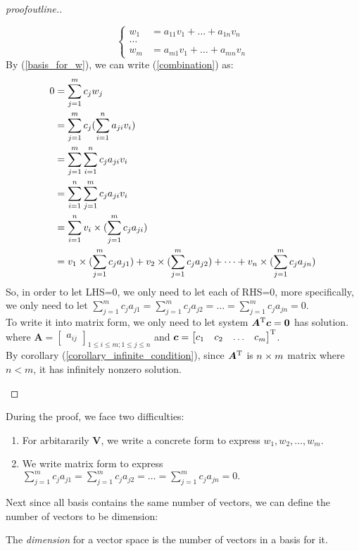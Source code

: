 \begin{proof}[proofoutline.]
\begin{itemize}
\begin{equation}
\left\{\begin{aligned}
w_1 &= a_{11}v_1 +\dots+a_{1n}v_n\\
\dots\\
w_m &= a_{m1}v_1 +\dots + a_{mn}v_n
\end{aligned}\right.
\end{equation}
By (\ref{basis_for_w}), we can write (\ref{combination}) as:
\[
\begin{aligned}
0 &= \sum_{j=1}^{m}c_jw_j\\
  &= \sum_{j=1}^{m}c_j(\sum_{i=1}^{n}a_{ji}v_i)\\
  &= \sum_{j=1}^{m}\sum_{i=1}^{n}c_ja_{ji}v_i\\
  &= \sum_{i=1}^{n}\sum_{j=1}^{m}c_ja_{ji}v_i\\
  &= \sum_{i=1}^{n}v_i\times(\sum_{j=1}^{m}c_ja_{ji})\\
  &= v_1\times(\sum_{j=1}^{m}c_ja_{j1}) + v_2\times(\sum_{j=1}^{m}c_ja_{j2}) +\dots +v_n\times(\sum_{j=1}^{m}c_ja_{jn})
\end{aligned}
\]
So, in order to let LHS=0, we only need to let each of RHS=0, more specifically, we only need to let $
\sum_{j=1}^{m}c_ja_{j1} = \sum_{j=1}^{m}c_ja_{j2} = \dots = \sum_{j=1}^{m}c_ja_{jn} = 0.$
\\To write it into matrix form, we only need to let system $\bm A^{\mathrm T} \bm c = \bm 0$ has solution. \\where $\bm A = \begin{bmatrix}
a_{ij}
\end{bmatrix}_{1\le i\le m;1\le j\le n}$ and $\bm c = \begin{bmatrix}
c_1&c_2&\dots&c_m
\end{bmatrix}^{\mathrm T}$.\\
By corollary (\ref{corollary_infinite_condition}), since $\bm A^{\mathrm T}$ is $n\times m$ matrix where $n<m$, it has infinitely nonzero solution.
\end{itemize}
\end{proof}
During the proof, we face two difficulties:
\begin{enumerate}
\item
For arbitararily $\bm V$, we write a concrete form to express $w_1,w_2,\dots,w_m$.
\item
We write matrix form to express $\sum_{j=1}^{m}c_ja_{j1} = \sum_{j=1}^{m}c_ja_{j2} = \dots = \sum_{j=1}^{m}c_ja_{jn} = 0.$
\end{enumerate}
Next since all basis contains the same number of vectors, we can define the number of vectors to be dimension:
\begin{definition}[Dimension]
The \emph{dimension} for a vector space is the number of vectors in a basis for it.
\end{definition}
